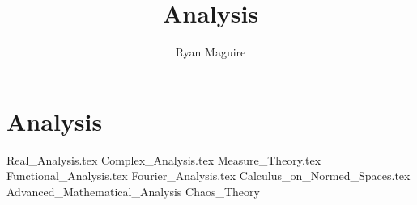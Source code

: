 \documentclass[crop=false,class=book,oneside]{standalone}                      %
\begin{document}
    \ifx\ifmain\undefined
        \title{Analysis}
        \author{Ryan Maguire}
        \date{\vspace{-5ex}}
        \maketitle
        \tableofcontents
        \listoffigures
        \listoftables
        \clearpage
    \fi
    \newif\ifmain
    \part{Analysis}
        {Real_Analysis.tex}
        {Complex_Analysis.tex}
        {Measure_Theory.tex}
        {Functional_Analysis.tex}
        {Fourier_Analysis.tex}
        {Calculus_on_Normed_Spaces.tex}
        {Advanced_Mathematical_Analysis}
        {Chaos_Theory}
\end{document}
